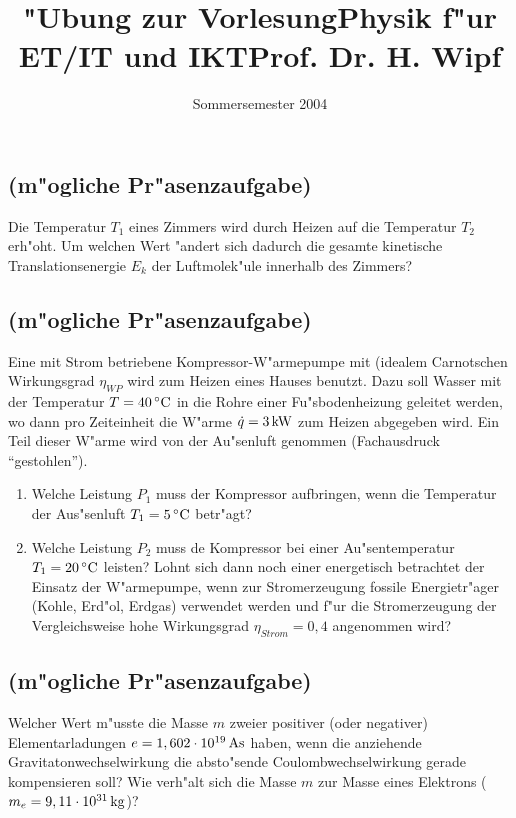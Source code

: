 \documentclass[twoside,colorbacktitle,accentcolor=tud0b]{tudexercise}
\title{"Ubung zur Vorlesung\linebreak[1] Physik f"ur ET/IT und IKT\linebreak[1] Prof. Dr. H. Wipf}
\subtitle{Sommersemester 2004}
\newcommand{\unit}[1]{{\rm\,#1}}
\begin{document}
  \begin{examheader}
    \examheaderdefault
  \end{examheader}
\setcounter{section}{9}
\maketitle
  \subsection{(m"ogliche Pr"asenzaufgabe)}
    Die Temperatur $T_1$ eines Zimmers wird durch Heizen auf die Temperatur $T_2$ erh"oht. Um
    welchen Wert "andert sich dadurch die gesamte kinetische Translationsenergie $E_k$ der
    Luftmolek"ule innerhalb des Zimmers?
  \subsection{(m"ogliche Pr"asenzaufgabe)}
    Eine mit Strom betriebene Kompressor-W"armepumpe mit (idealem Carnotschen Wirkungsgrad
    $\eta_{WP}$ wird zum Heizen eines Hauses benutzt. Dazu soll Wasser mit der Temperatur
    $T=40\unit{^\circ C}$ in die Rohre einer Fu"sbodenheizung geleitet werden, wo dann pro
    Zeiteinheit die W"arme $\dot{q}=3\unit{kW}$ zum Heizen abgegeben wird. Ein Teil dieser W"arme
    wird von der Au"senluft genommen (Fachausdruck "`gestohlen"').
    \begin{enumerate}
      \item Welche Leistung $P_1$ muss der Kompressor aufbringen, wenn die Temperatur der
      Aus"senluft $T_1=5\unit{^\circ C}$ betr"agt?
      \item Welche Leistung $P_2$ muss de Kompressor bei einer Au"sentemperatur
      $T_1=20\unit{^\circ C}$ leisten? Lohnt sich dann noch einer energetisch betrachtet der Einsatz
      der W"armepumpe, wenn zur Stromerzeugung fossile Energietr"ager (Kohle, Erd"ol, Erdgas)
      verwendet werden und f"ur die Stromerzeugung der Vergleichsweise hohe Wirkungsgrad
      \hbox{$\eta_{Strom}=0,4$} angenommen wird? 
    \end{enumerate}
  \subsection{(m"ogliche Pr"asenzaufgabe)}
    Welcher Wert m"usste die Masse $m$ zweier positiver (oder negativer) Elementarladungen
    $e=1,602\cdot10^{19}\unit{As}$ haben, wenn die anziehende Gravitatonwechselwirkung die
    absto"sende Coulombwechselwirkung gerade kompensieren soll? Wie verh"alt sich die Masse $m$ zur
    Masse eines Elektrons ($m_e=9,11\cdot 10^{31}\unit{kg}$)?
\end{document}

